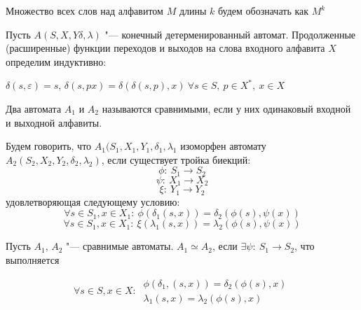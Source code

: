 \begin{definition}
    Множество всех слов над алфавитом $M$ длины $k$ будем обозначать как $M^k$
\end{definition}

\begin{definition}
    Пусть $A(S, X, Y \delta, \lambda)$ "--- конечный детерменированный автомат.
    Продолженные (расширенные) функции переходов и выходов на слова входного
    алфавита $X$ определим индуктивно:
    
    $\delta(s, \varepsilon) = s$, $\delta(s, px) = \delta(\delta(s, p), x)
    ~\forall s \in S , ~p \in X^* ,~ x \in X$
\end{definition}


\begin{definition}
    Два автомата $A_1$ и $A_2$ называются сравнимыми, если у них одинаковый
    входной и выходной алфавиты.
\end{definition}

\begin{definition}
    Будем говорить, что $A_1(S_1, X_1, Y_1, \delta_1, \lambda_1$ изоморфен
    автомату $A_2(S_2, X_2, Y_2, \delta_2, \lambda_2)$, если существует
    тройка биекций:
    \begin{equation*}
        \phi : ~ S_1 \rightarrow S_2
    \end{equation*}
    \begin{equation*}
        \psi : ~ X_1 \rightarrow X_2
    \end{equation*}
    \begin{equation*}
        \xi : ~ Y_1 \rightarrow Y_2
    \end{equation*}
    удовлетворяющая следующему условию:
    \begin{equation*}
        \forall s \in S_1, x \in X_1 : ~ \phi(\delta_1(s, x)) = \delta_2(\phi(s), \psi(x))
    \end{equation*}
    \begin{equation*}
        \forall s \in S_1, x \in X_1 : ~ \xi(\lambda_1(s, x)) = \lambda_2(\phi(s), \psi(x))
    \end{equation*}
\end{definition}



\begin{definition}
    Пусть $A_1$, $A_2$ "--- сравнимые автоматы. $A_1 \simeq A_2$, если
    $\exists \psi: ~ S_1 \rightarrow S_2$, что выполняется

    \begin{equation*}
        \forall s \in S, x \in X:~ \begin{matrix}
             \phi(\delta_1, (s, x)) = \delta_2(\phi(s), x) \\
             \lambda_1(s, x) = \lambda_2(\phi(s), x)
        \end{matrix}
    \end{equation*}
\end{definition}


